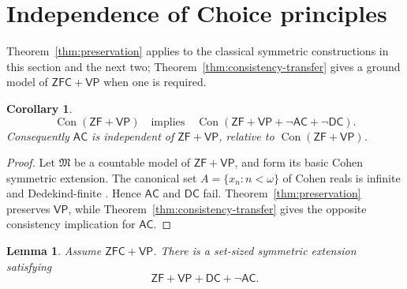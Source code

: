 \documentclass[11pt,a4paper]{amsart}
\newcommand{\VP}{\mathsf{VP}}
\newcommand{\AC}{\mathsf{AC}}
\newcommand{\ZF}{\mathsf{ZF}}
\newcommand{\ZFC}{\mathsf{ZFC}}
\newcommand{\Con}{\operatorname{Con}}
\newcommand{\DC}{\mathsf{DC}}
\theoremstyle{plain}
\newtheorem{lemma}[theorem]{Lemma}
\newtheorem{corollary}[theorem]{Corollary}
\theoremstyle{definition}
\theoremstyle{remark}
\begin{document}
\section{{Independence of Choice principles}}

Theorem~\ref{thm:preservation} applies to the classical symmetric constructions in this section and the next two; Theorem~\ref{thm:consistency-transfer} gives a ground model of $\ZFC+\VP$ when one is required.

\begin{corollary}\label{cor:choice}
\[
\Con(\ZF+\VP)\quad\text{implies}\quad
\Con(\ZF+\VP+\neg\AC+\neg\DC).
\]
Consequently $\AC$ is independent of $\ZF+\VP$, relative to $\Con(\ZF+\VP)$.
\end{corollary}

\begin{proof}
Let $\mathfrak M$ be a countable model of $\ZF+\VP$, and form its basic Cohen symmetric extension.  The canonical set $A=\{x_n:n<\omega\}$ of Cohen reals is infinite and Dedekind-finite \cite[Section~5.3]{Jech}.  Hence $\AC$ and $\DC$ fail.  Theorem~\ref{thm:preservation} preserves $\VP$, while Theorem~\ref{thm:consistency-transfer} gives the opposite consistency implication for $\AC$.
\end{proof}

\begingroup

\begin{lemma}\label{lem:omega1-Cohen}
Assume $\ZFC+\VP$.  There is a set-sized symmetric extension satisfying
\[
\ZF+\VP+\DC+\neg\AC.
\]
\end{lemma}
\end{document}
